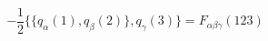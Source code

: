 \begin{equation}                      
- \frac{1}{2} \{\{q_{\alpha}(1), q_{\beta}(2)\}, q_{\gamma}(3)\} =                        
F_{\alpha \beta \gamma}(123)                       
\end{equation} 
